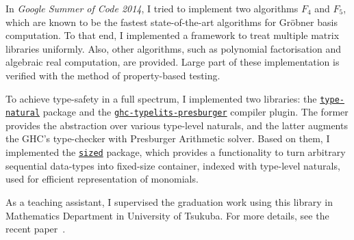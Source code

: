 \documentclass{moderncv}
\begin{document}
 In \emph{Google Summer of Code 2014}, I tried to implement two algorithms $F_4$ and $F_5$, which are known to be the fastest state-of-the-art algorithms for Gr\"{o}bner basis computation.
 To that end, I implemented a framework to treat multiple matrix libraries uniformly.
 Also, other algorithms, such as polynomial factorisation and algebraic real computation, are provided.
 Large part of these implementation is verified with the method of property-based testing.

 To achieve type-safety in a full spectrum, I implemented two libraries: the \href{http://hackage.haskell.org/package/type-natural}{\texttt{type-natural}} package and the \href{http://hackage.haskell.org/package/ghc-typelits-presburger}{\texttt{ghc-typelits-presburger}} compiler plugin.
 The former provides the abstraction over various type-level naturals, and the latter augments the GHC's type-checker with Presburger Arithmetic solver.
 Based on them, I implemented the \href{http://hackage.haskell.org/package/sized}{\texttt{sized}} package, which provides a functionality to turn arbitrary sequential data-types into fixed-size container, indexed with type-level naturals, used for efficient representation of monomials.

 As a teaching assistant, I supervised the graduation work using this library in Mathematics Department in University of Tsukuba.
 For more details, see the recent paper~\cite{ISHII:2018ek}.

\nocite{*}
\printbibliography[title={Publications},prenote=note]
\end{document}
